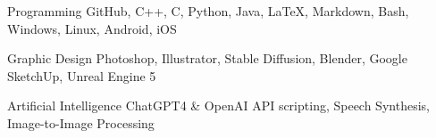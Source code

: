 


\begin{cvskills}


  \cvskill
    {Programming} %
    {GitHub, C++, C, Python, Java, LaTeX, Markdown, Bash, Windows, Linux, Android, iOS} %

  \cvskill
    {Graphic Design} %
    {Photoshop, Illustrator, Stable Diffusion, Blender, Google SketchUp, Unreal Engine 5} %

  \cvskill
    {Artificial Intelligence} %
	{ChatGPT4 \& OpenAI API scripting, Speech Synthesis, Image-to-Image Processing} %


\end{cvskills}
